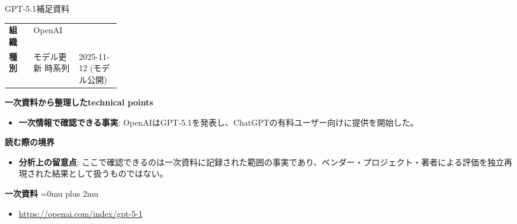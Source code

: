 \begin{technicalnote}{GPT-5.1}{補足資料}
\begingroup
\begin{tabularx}{\linewidth}{@{}>{\bfseries}p{0.22\linewidth}X@{}}
組織 & OpenAI \\
種別 & モデル更新
時系列 & 2025-11-12 (モデル公開) \\
\end{tabularx}
\smallskip
{\bfseries 一次資料から整理したtechnical points}
\begin{itemize}[leftmargin=1.5em,itemsep=0.35em]
\item \textbf{一次情報で確認できる事実}: OpenAIはGPT-5.1を発表し、ChatGPTの有料ユーザー向けに提供を開始した。
\end{itemize}
\begin{minipage}{\linewidth}
{\bfseries 読む際の境界}
\begin{itemize}[leftmargin=1.5em,itemsep=0.35em]
\item \textbf{分析上の留意点}: ここで確認できるのは一次資料に記録された範囲の事実であり、ベンダー・プロジェクト・著者による評価を独立再現された結果として扱うものではない。
\end{itemize}
\begin{samepage}
{\bfseries 一次資料}
\begingroup\sloppy
\Urlmuskip=0mu plus 2mu\relax
\begin{itemize}[leftmargin=1.5em,itemsep=0.25em]
\item {\scriptsize\url{https://openai.com/index/gpt-5-1}}
\end{itemize}
\endgroup
\end{samepage}
\end{minipage}
\endgroup
\end{technicalnote}
\medskip

